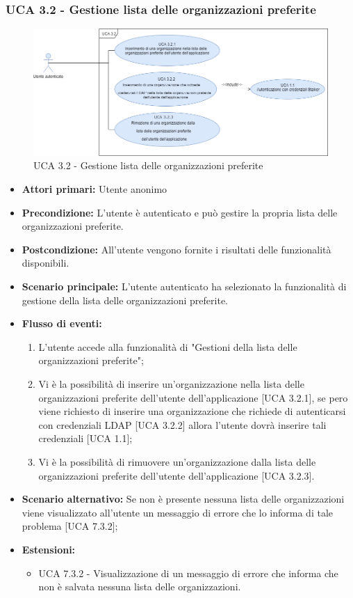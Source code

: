 \subsubsection{UCA 3.2 - Gestione lista delle organizzazioni preferite}%
\begin{figure}[h]
	\centering
	
	\includegraphics[scale=0.5]{sezioni/UseCase/Immagini/UCA3.2.png}
	\caption{UCA 3.2 - Gestione lista delle organizzazioni preferite}
\end{figure}
\begin{itemize}
	\item \textbf{Attori primari:} Utente anonimo
	\item \textbf{Precondizione:} L'utente è autenticato e può gestire la propria lista delle organizzazioni preferite.
	\item \textbf{Postcondizione:} All'utente vengono fornite i risultati delle funzionalità disponibili.
	\item \textbf{Scenario principale:} L'utente autenticato ha selezionato la funzionalità di gestione della lista delle organizzazioni preferite.
	\item \textbf{Flusso di eventi:}
			\begin{enumerate}
			\item L'utente accede alla funzionalità di "Gestioni della lista delle organizzazioni preferite";
			\item Vi è la possibilità di inserire un'organizzazione nella lista delle organizzazioni preferite dell'utente dell'applicazione [UCA 3.2.1], se pero viene richiesto di inserire una organizzazione che richiede di autenticarsi con credenziali LDAP [UCA 3.2.2] allora l'utente dovrà inserire tali credenziali [UCA 1.1];
			\item Vi è la possibilità di rimuovere un'organizzazione dalla lista delle organizzazioni preferite dell'utente dell'applicazione [UCA 3.2.3].
			\end{enumerate}
	\item \textbf{Scenario alternativo:} Se non è presente nessuna lista delle organizzazioni viene visualizzato all'utente un messaggio di errore che lo informa di tale problema [UCA 7.3.2];
	\item \textbf{Estensioni:}
	\begin{itemize}
		\item UCA 7.3.2 - Visualizzazione di un messaggio di errore che informa che non è salvata nessuna lista delle organizzazioni.
	\end{itemize}
\end{itemize}

